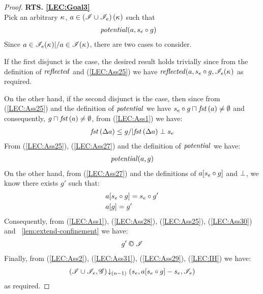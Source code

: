 \begin{lemma}
\begin{proof}
\noindent\textbf{RTS. \ref{LEC:Goal3}}\\
Pick an arbitrary $\kappa_{}$, $a \in \left(\mathscr{I} \cup \mathscr{I}_e\right)(\kappa_{})$ such that
%
\begin{align}
	& \mathit{potential}(a, s_e \circ g)  \label{LEC:Ass25}
\end{align}
Since $a \in \mathscr{I}_e(\kappa_{}) |/  a \in\mathscr{I}(\kappa_{})$, there are two cases to consider. 

If the first disjunct is the case, the desired result holds trivially since from the definition of $\mathit{reflected}$ and (\ref{LEC:Ass25}) we have $\mathit{reflected}(a, s_e \circ g, \mathscr{I}_e(\kappa_{})$ as required.

On the other hand, if the second disjunct is the case, then since from (\ref{LEC:Ass25}) and the definition of $\mathit{potential}$ we have $s_e \circ g \sqcap_{} \mathit{fst}\left(a\right) \not= \emptyset$ and consequently, $g \sqcap_{} \mathit{fst}\left(a\right) \not= \emptyset$, from (\ref{LEC:Ass1}) we have:
%
\begin{align}
	\mathit{fst}\left(\Delta {a}\right) \leq g /| \mathit{fst}\left(\Delta {a}\right) \mathrel{\bot} s_e \label{LEC:Ass27}
\end{align}
% 
From (\ref{LEC:Ass25}), (\ref{LEC:Ass27}) and the definition of $\mathit{potential}$ we have:
%
\begin{align}
	\mathit{potential}(a, g) \label{LEC:Ass28}
\end{align}
%
On the other hand, from (\ref{LEC:Ass27}) and the definitions of $a[s_e \circ g]$ and $\mathrel{\bot}$, we know there exists $g'$ such that: 
%
\begin{align}
	& a[s_e \circ g] = s_e \circ g' \label{LEC:Ass29}\\
	& a[g] = g'  \label{LEC:Ass30}
\end{align}
%
Consequently, from (\ref{LEC:Ass1}), (\ref{LEC:Ass28}), (\ref{LEC:Ass25}), (\ref{LEC:Ass30}) and \lem~\ref{lem:extend-confinement} we have:
%
\begin{align}
	g' \confines \lmod  \label{LEC:Ass31}
\end{align}
%
Finally, from (\ref{LEC:Ass2}), (\ref{LEC:Ass31}), (\ref{LEC:Ass29}), (\ref{LEC:IH}) we have:
%
\begin{align*}
	\left(\mathscr{I} \cup \mathscr{I}_{e}, \mathscr{G}\right) \!\downarrow_{(n-1)} \left(s_e, a[s_e \circ g] - s_e, \mathscr{I}_e\right)
\end{align*}
%
as required.
\end{proof}
\end{lemma}
%
%
%
%
%
%
%
%
%
%
%
